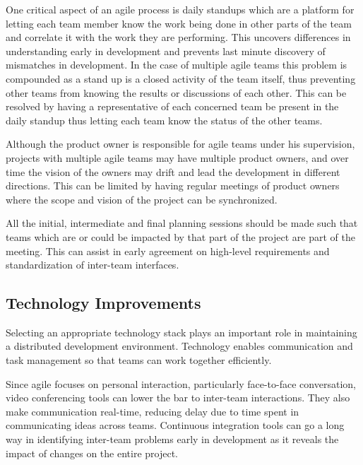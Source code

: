 One critical aspect of an agile process is daily standups which are a platform for letting each team member know the work being done in other parts of the team and correlate it with the work they are performing.
This uncovers differences in understanding early in development and prevents last minute discovery of mismatches in development.
In the case of multiple agile teams this problem is compounded as a stand up is a closed activity of the team itself, thus preventing other teams from knowing the results or discussions of each other.
This can be resolved by having a representative of each concerned team be present in the daily standup thus letting each team know the status of the other teams.

Although the product owner is responsible for agile teams under his supervision, projects with multiple agile teams may have multiple product owners, and over time the vision of the owners may drift and lead the development in different directions.
This can be limited by having regular meetings of product owners where the scope and vision of the project can be synchronized.

All the initial, intermediate and final planning sessions should be made such that teams which are or could be impacted by that part of the project are part of the meeting.
This can assist in early agreement on high-level requirements and standardization of inter-team interfaces.

\subsection{Technology Improvements} \label{sec:tech_impv}
Selecting an appropriate technology stack plays an important role in maintaining a distributed development environment.
Technology enables communication and task management so that teams can work together efficiently.

Since agile focuses on personal interaction, particularly face-to-face conversation, video conferencing tools can lower the bar to inter-team interactions.
They also make communication real-time, reducing delay due to time spent in communicating ideas across teams.
Continuous integration tools can go a long way in identifying inter-team problems early in development
as it reveals the impact of changes on the entire project.



